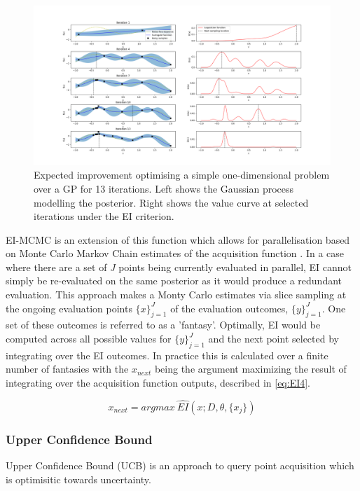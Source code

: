 \documentclass{article}
\begin{document}
			\begin{figure}[h]

			\includegraphics[trim=20 0 0 0 ,scale=0.25]{EIsimp.png}

			\caption{
			Expected improvement optimising a simple one-dimensional problem over a GP for 13 iterations. Left shows the Gaussian process modelling the posterior. Right shows the value curve at selected iterations under the EI criterion.
			}
			\label{fig:EI1}

			\end{figure}



			EI-MCMC is an extension of this function which allows for parallelisation based on Monte Carlo Markov Chain estimates of the acquisition function \cite{17}. In a case where there are a set of \textit{J} points being currently evaluated in parallel, EI cannot simply be re-evaluated on the same posterior as it would produce a redundant evaluation. This approach makes a Monty Carlo estimates via slice sampling at the ongoing evaluation points \({\{x\}}_{j=1}^J\) of the evaluation outcomes, \(\{y\}_{j=1}^J\). One set of these outcomes is referred to as a 'fantasy'. Optimally, EI would be computed across all possible values for \(\{y\}_{j=1}^J\) and the next point selected by integrating over the EI outcomes. In practice this is calculated over a finite number of fantasies with the \(x_{next}\) being the argument maximizing the result of integrating over the acquisition function outputs, described in \ref{eq:EI4}.

			\begin{equation}\label{eq:EI4} x_{next} = argmax~ \widehat{EI}(x; D, \theta,\{x_j\})\end{equation}


		\subsubsection{Upper Confidence Bound}
			Upper Confidence Bound (UCB) is an approach to query point acquisition which is optimisitic towards uncertainty. 
\end{document}
